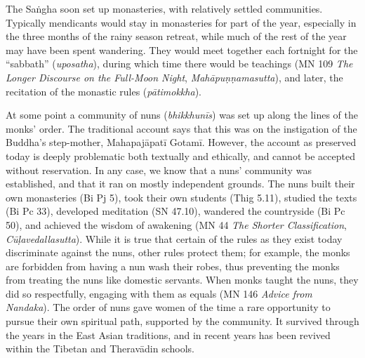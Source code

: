 \documentclass[12pt,openany]{book}%
\begin{document}
The \textsanskrit{Saṅgha} soon set up monasteries, with relatively settled communities. Typically mendicants would stay in monasteries for part of the year, especially in the three months of the rainy season retreat, while much of the rest of the year may have been spent wandering. They would meet together each fortnight for the “sabbath” (\textit{uposatha}), during which time there would be teachings (MN 109 \textit{The Longer Discourse on the Full-Moon Night}, \textit{\textsanskrit{Mahāpuṇṇamasutta}}), and later, the recitation of the monastic rules (\textit{\textsanskrit{pātimokkha}}).

At some point a community of nuns (\textit{\textsanskrit{bhikkhunīs}}) was set up along the lines of the monks’ order. The traditional account says that this was on the instigation of the Buddha’s step-mother, \textsanskrit{Mahapajāpatī} \textsanskrit{Gotamī}. However, the account as preserved today is deeply problematic both textually and ethically, and cannot be accepted without reservation. In any case, we know that a nuns’ community was established, and that it ran on mostly independent grounds. The nuns built their own monasteries (Bi Pj 5), took their own students (Thig 5.11), studied the texts (Bi Pc 33), developed meditation (SN 47.10), wandered the countryside (Bi Pc 50), and achieved the wisdom of awakening (MN 44 \textit{The Shorter Classification}, \textit{\textsanskrit{Cūḷavedallasutta}}). While it is true that certain of the rules as they exist today discriminate against the nuns, other rules protect them; for example, the monks are forbidden from having a nun wash their robes, thus preventing the monks from treating the nuns like domestic servants. When monks taught the nuns, they did so respectfully, engaging with them as equals (MN 146 \textit{Advice from Nandaka}). The order of nuns gave women of the time a rare opportunity to pursue their own spiritual path, supported by the community. It survived through the years in the East Asian traditions, and in recent years has been revived within the Tibetan and \textsanskrit{Theravādin} schools.
\end{document}
